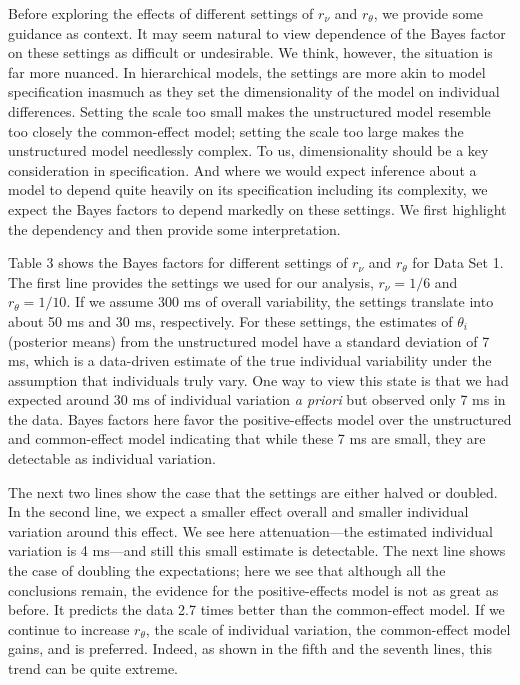 \documentclass[american,man]{apa6}
\begin{document}
Before exploring the effects of different settings of \(r_\nu\) and
\(r_\theta\), we provide some guidance as context. It may seem natural
to view dependence of the Bayes factor on these settings as difficult or
undesirable. We think, however, the situation is far more nuanced. In
hierarchical models, the settings are more akin to model specification
inasmuch as they set the dimensionality of the model on individual
differences. Setting the scale too small makes the unstructured model
resemble too closely the common-effect model; setting the scale too
large makes the unstructured model needlessly complex. To us,
dimensionality should be a key consideration in specification. And where
we would expect inference about a model to depend quite heavily on its
specification including its complexity, we expect the Bayes factors to
depend markedly on these settings. We first highlight the dependency and
then provide some interpretation.

Table 3 shows the Bayes factors for different settings of \(r_\nu\) and
\(r_\theta\) for Data Set 1. The first line provides the settings we
used for our analysis, \(r_\nu = 1/6\) and \(r_\theta = 1/10\). If we
assume 300 ms of overall variability, the settings translate into about
50 ms and 30 ms, respectively. For these settings, the estimates of
\(\theta_i\) (posterior means) from the unstructured model have a
standard deviation of 7 ms, which is a data-driven estimate of the true
individual variability under the assumption that individuals truly vary.
One way to view this state is that we had expected around 30 ms of
individual variation \emph{a priori} but observed only 7 ms in the data.
Bayes factors here favor the positive-effects model over the
unstructured and common-effect model indicating that while these 7 ms
are small, they are detectable as individual variation.

The next two lines show the case that the settings are either halved or
doubled. In the second line, we expect a smaller effect overall and
smaller individual variation around this effect. We see here
attenuation---the estimated individual variation is 4 ms---and still
this small estimate is detectable. The next line shows the case of
doubling the expectations; here we see that although all the conclusions
remain, the evidence for the positive-effects model is not as great as
before. It predicts the data 2.7 times better than the common-effect
model. If we continue to increase \(r_\theta\), the scale of individual
variation, the common-effect model gains, and is preferred. Indeed, as
shown in the fifth and the seventh lines, this trend can be quite
extreme.
\end{document}
